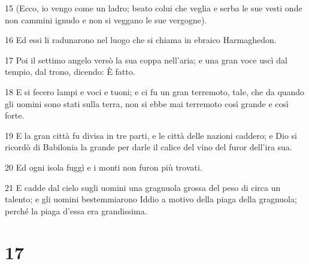 \par 15 (Ecco, io vengo come un ladro; beato colui che veglia e serba le sue vesti onde non cammini ignudo e non si veggano le sue vergogne).
\par 16 Ed essi li radunarono nel luogo che si chiama in ebraico Harmaghedon.
\par 17 Poi il settimo angelo versò la sua coppa nell'aria; e una gran voce uscì dal tempio, dal trono, dicendo: È fatto.
\par 18 E si fecero lampi e voci e tuoni; e ci fu un gran terremoto, tale, che da quando gli uomini sono stati sulla terra, non si ebbe mai terremoto così grande e così forte.
\par 19 E la gran città fu divisa in tre parti, e le città delle nazioni caddero; e Dio si ricordò di Babilonia la grande per darle il calice del vino del furor dell'ira sua.
\par 20 Ed ogni isola fuggì e i monti non furon più trovati.
\par 21 E cadde dal cielo sugli uomini una gragnuola grossa del peso di circa un talento; e gli uomini bestemmiarono Iddio a motivo della piaga della gragnuola; perché la piaga d'essa era grandissima.

\chapter{17}


